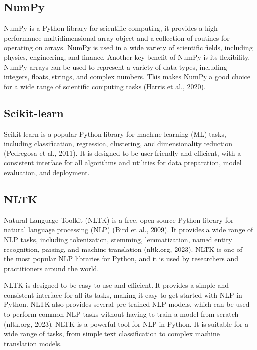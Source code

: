 \documentclass{article}
\begin{document}
\begin{multicols}{2}
\subsection{NumPy}
NumPy is a Python library for scientific computing, it provides a high-performance multidimensional array object and a collection of routines for operating on arrays. NumPy is used in a wide variety of scientific fields, including physics, engineering, and finance. Another key benefit of NumPy is its flexibility. NumPy arrays can be used to represent a variety of data types, including integers, floats, strings, and complex numbers. This makes NumPy a good choice for a wide range of scientific computing tasks (Harris et al., 2020).

\subsection{Scikit-learn}
Scikit-learn is a popular Python library for machine learning (ML) tasks, including classification, regression, clustering, and dimensionality reduction (Pedregosa et al., 2011). It is designed to be user-friendly and efficient, with a consistent interface for all algorithms and utilities for data preparation, model evaluation, and deployment.

\subsection{NLTK}
Natural Language Toolkit (NLTK) is a free, open-source Python library for natural language processing (NLP) (Bird et al., 2009). It provides a wide range of NLP tasks, including tokenization, stemming, lemmatization, named entity recognition, parsing, and machine translation (nltk.org, 2023). NLTK is one of the most popular NLP libraries for Python, and it is used by researchers and practitioners around the world.

NLTK is designed to be easy to use and efficient. It provides a simple and consistent interface for all its tasks, making it easy to get started with NLP in Python. NLTK also provides several pre-trained NLP models, which can be used to perform common NLP tasks without having to train a model from scratch (nltk.org, 2023). NLTK is a powerful tool for NLP in Python. It is suitable for a wide range of tasks, from simple text classification to complex machine translation models.


\end{multicols}
\end{document}
